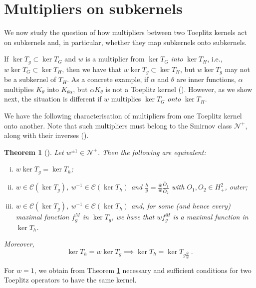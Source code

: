 \documentclass{article}
\numberwithin{equation}{section}
\theoremstyle{plain}
\newtheorem{thm}{Theorem}[section]
\newcommand{\Hp}{\ensuremath{H^2_+}}
\newcommand{\CCC}{\ensuremath{\mathcal{C}}}
\newcommand{\NN}{\ensuremath{\mathcal{N}^+}}
\newcommand{\ol}[1]{\ensuremath{\overline{#1}}}
\newcommand{\kertg}{\ensuremath{\ker T_g}}
\begin{document}
\section{Multipliers on subkernels}
\label{sec:multipliers_subkernels}


We now study the question of how multipliers between two Toeplitz kernels act on subkernels and, in particular, whether they map subkernels onto subkernels.


If $\kertg \subset \ker T_G$ and $w$ is a multiplier from $\ker T_G$ \emph{into} $\ker T_H$, i.e., $w \ker T_G \subset \ker T_H$, then we have that $w \kertg \subset \ker T_H $, but $w \kertg$ may not be a subkernel of $T_H$.
As a concrete example, if $\alpha$ and $\theta$ are inner functions, $\alpha$ multiplies $K_\theta$ into $K_{\theta\alpha}$, but $\alpha K_\theta$ is not a Toeplitz kernel (\cite{CP14,CP24}).
However, as we show next, the situation is different if $w$ multiplies $\ker T_G$ \emph{onto} $\ker T_H$.


We have the following characterisation of multipliers from one Toeplitz kernel onto another.
Note that such multipliers must belong to the Smirnov class \NN, along with their inverses (\cite{CP18_multipliers}).


\begin{thm}[{\cite{CP18_multipliers}}]
\label{thm:multiplicadores_onto_kernels}
Let $w^{\pm 1} \in \NN$.
Then the following are equivalent:
\begin{enumerate}[(i)]
\item $w \ker T_g = \ker T_h$;

\item $w \in \CCC (\ker T_g)$, $w^{-1} \in \CCC (\ker T_h)$ and $\frac{h}{g} = \frac{\ol w}{w} \frac{\ol O_1}{\ol O_2}$ with $O_1,O_2 \in \Hp$, outer;

\item $w \in \CCC (\ker T_g)$, $w^{-1} \in \CCC (\ker T_h)$ and, for some (and hence every) maximal function $f^M_g$ in $\ker T_g$, we have that $w f^M_g$ is a maximal function in $\ker T_h$.
\end{enumerate}

Moreover,
\begin{equation}
\label{eq:simbolo_vindo_de_multiplicador}
\ker T_h = w \ker T_g \implies \ker T_h = \ker T_{g\frac{\ol w}{w}}\ .
\end{equation}

\end{thm}


For $w=1$, we obtain from Theorem \ref{thm:multiplicadores_onto_kernels} necessary and  sufficient conditions for two Toeplitz operators to have the same kernel.
\end{document}
